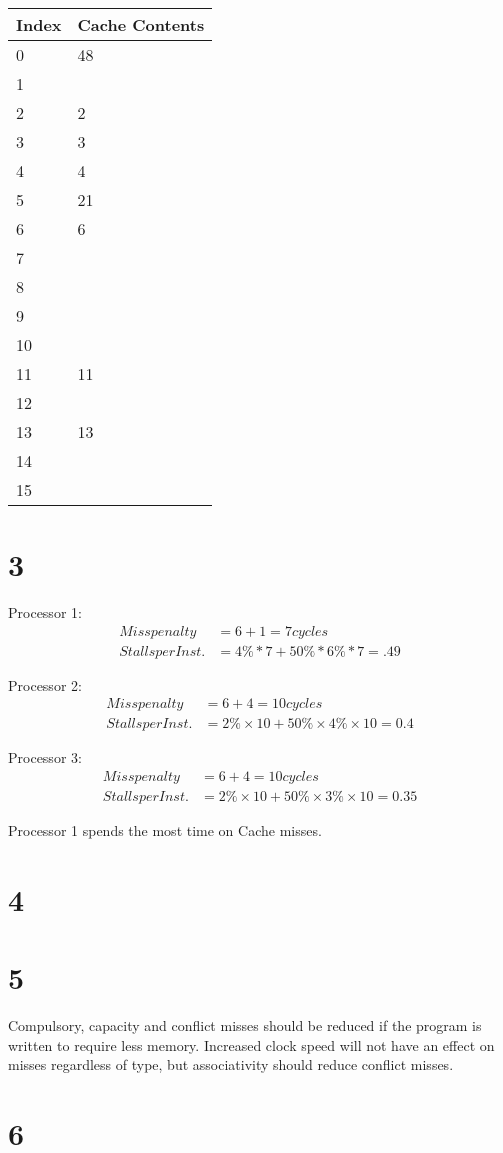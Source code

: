 \documentclass{article}
\begin{document}
\begin{tabular}{|l|l|}
\hline
Index & Cache Contents \\ \hline
0 & 48 \\ \hline
1 & \\ \hline
2 & 2 \\ \hline
3 & 3 \\ \hline
4 & 4 \\ \hline
5 & 21 \\ \hline
6 & 6 \\ \hline
7 & \\ \hline
8 & \\ \hline
9 & \\ \hline
10 & \\ \hline
11 & 11 \\ \hline
12 & \\ \hline
13 & 13 \\ \hline
14 & \\ \hline
15 & \\ \hline
\end{tabular}

\section*{3} 

Processor 1:
\begin{align*}
Miss penalty &= 6 + 1 = 7 cycles \\
Stalls per Inst. &= 4\% * 7 + 50\% * 6\% * 7 =.49
\end{align*}

Processor 2:
\begin{align*}
Miss penalty &= 6 + 4 = 10 cycles \\
Stalls per Inst. &= 2\% × 10 + 50\% × 4\% × 10 = 0.4
\end{align*}

Processor 3:
\begin{align*}
Miss penalty &= 6 + 4 = 10 cycles \\
Stalls per Inst. &= 2\% × 10 + 50\% × 3\% × 10 = 0.35
\end{align*}

Processor 1 spends the most time on Cache misses.

\section*{4}

\section*{5} 

Compulsory, capacity and conflict misses should be reduced if the program is written to require less memory. Increased clock speed will not have an effect on misses regardless of type, but associativity should reduce conflict misses.

\section*{6}
\end{document}
